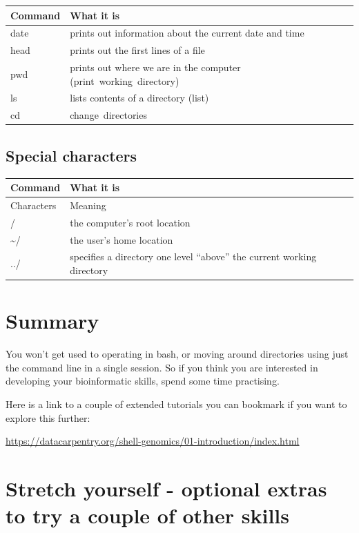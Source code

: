 \documentclass[
]{book}
\begin{document}
\begin{longtable}{ll}
\toprule
\textbf{Command} & \textbf{What it is}\\
\midrule
date & prints out information about the current date and time\\
head & prints out the first lines of a file\\
pwd & prints out where we are in the computer (print working directory)\\
ls & lists contents of a directory (list)\\
cd & change directories\\
\bottomrule
\end{longtable}

\hypertarget{special-characters}{%
\subsection{Special characters}\label{special-characters}}

\begin{longtable}{ll}
\toprule
\textbf{Command} & \textbf{What it is}\\
\midrule
Characters & Meaning\\
/ & the computer’s root location\\
\textasciitilde{}/ & the user’s home location\\
../ & specifies a directory one level “above” the current working directory\\
\bottomrule
\end{longtable}

\hypertarget{summary-1}{%
\section{Summary}\label{summary-1}}

You won't get used to operating in bash, or moving around directories using just the command line in a single session. So if you think you are interested in developing your bioinformatic skills, spend some time practising.

Here is a link to a couple of extended tutorials you can bookmark if you want to explore this further:

\url{https://datacarpentry.org/shell-genomics/01-introduction/index.html}

\hypertarget{stretch-yourself---optional-extras-to-try-a-couple-of-other-skills}{%
\section{Stretch yourself - optional extras to try a couple of other skills}\label{stretch-yourself---optional-extras-to-try-a-couple-of-other-skills}}
\end{document}
